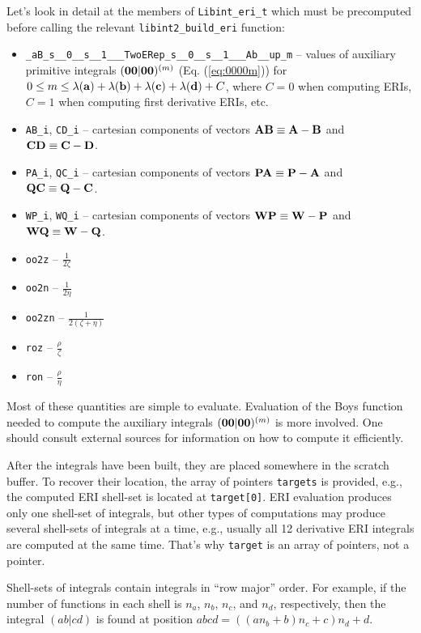 \documentclass[12pt]{article}
\begin{document}
Let's look in detail at the members of {\tt Libint\_eri\_t} which must be precomputed before
calling the relevant {\tt libint2\_build\_eri} function:
\begin{itemize}
\item {\tt \_aB\_s\_\_0\_\_s\_\_1\_\_\_TwoERep\_s\_\_0\_\_s\_\_1\_\_\_Ab\_\_up\_m} --
values of auxiliary primitive integrals $({\bf 00}|{\bf 00})^{(m)}$ (Eq. (\ref{eq:0000m}))
for $0 \leq m \leq \lambda({\bf a}) + \lambda({\bf b}) + \lambda({\bf c}) + \lambda({\bf d}) + C$,
where $C = 0$ when computing ERIs, $C=1$ when computing first derivative ERIs, etc.
\item {\tt AB\_i}, {\tt CD\_i} -- cartesian components of vectors ${\bf AB} \equiv {\bf A} - {\bf B}$
and ${\bf CD} \equiv {\bf C} - {\bf D}$.
\item {\tt PA\_i}, {\tt QC\_i} -- cartesian components of vectors ${\bf PA} \equiv {\bf P} - {\bf A}$
and ${\bf QC} \equiv {\bf Q} - {\bf C}$.
\item {\tt WP\_i}, {\tt WQ\_i} -- cartesian components of vectors ${\bf WP} \equiv {\bf W} - {\bf P}$
and ${\bf WQ} \equiv {\bf W} - {\bf Q}$.
\item {\tt oo2z} -- $\frac{1}{2\zeta}$
\item {\tt oo2n} -- $\frac{1}{2\eta}$
\item {\tt oo2zn} -- $\frac{1}{2(\zeta+\eta)}$
\item {\tt roz} -- $\frac{\rho}{\zeta}$
\item {\tt ron} -- $\frac{\rho}{\eta}$
\end{itemize}
Most of these quantities are simple to evaluate. Evaluation of the Boys function needed to compute
the auxiliary integrals $({\bf 00}|{\bf 00})^{(m)}$ is more involved.
One should consult external sources for information on how
to compute it efficiently.\cite{Gill91,TaylorInterpolation,IshidaFm}

After the integrals have been built, they are placed somewhere in the scratch buffer.
To recover their location, the array of pointers {\tt targets} is provided, e.g.,
the computed ERI shell-set is located at {\tt target[0]}.
ERI evaluation produces only one shell-set of integrals, but other types of computations
may produce several shell-sets of integrals at a time, e.g., usually all 12 derivative
ERI integrals are computed at the same time. That's why {\tt target} is an array of pointers, not a pointer.

Shell-sets of integrals contain integrals in ``row major'' order.\cite{KnuthACP} For example, if
the number of functions in each shell is $n_a$, $n_b$, $n_c$, and $n_d$, respectively,
then the integral $(ab|cd)$ is found at position $abcd = ( (a n_b + b) n_c + c) n_d + d$.
\end{document}
